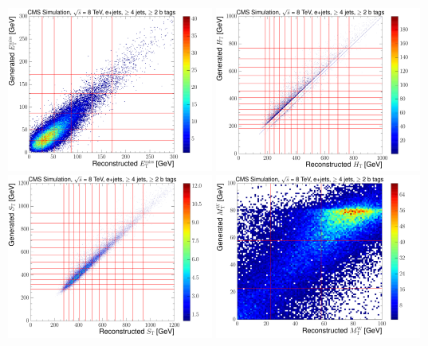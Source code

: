 \begin{figure}[hbtp]
    \centering
     \includegraphics[width=0.48\textwidth]{Chapters/07_08_09_Analysis/Images/binning/electron_MET_8TeV}\hfill
     \includegraphics[width=0.48\textwidth]{Chapters/07_08_09_Analysis/Images/binning/electron_HT_8TeV}\\
     \includegraphics[width=0.48\textwidth]{Chapters/07_08_09_Analysis/Images/binning/electron_ST_8TeV}\hfill
     \includegraphics[width=0.48\textwidth]{Chapters/07_08_09_Analysis/Images/binning/electron_MT_8TeV}\\

\end{figure}

